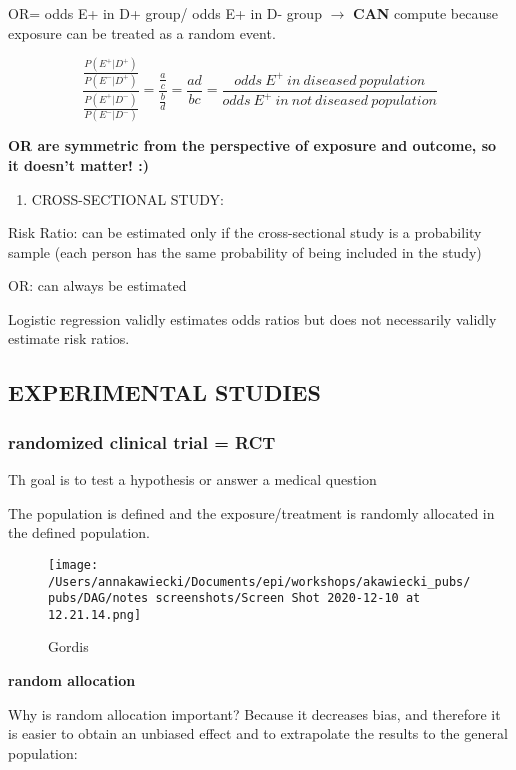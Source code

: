 \documentclass[
]{article}
\providecommand{\tightlist}{%
  \setlength{\itemsep}{0pt}\setlength{\parskip}{0pt}}
\begin{document}
OR= odds E+ in D+ group/ odds E+ in D- group \(\to\) \textbf{CAN}
compute because exposure can be treated as a random event.

\[\frac{\frac{P(E^+|D^+)}{P(E^-|D^+)}}{\frac{P(E^+|D^-)}{P(E^-|D^-)}}=\frac{\frac{a}{c}}{\frac{b}{d}}=\frac{ad}{bc}=\frac{odds\:E^+\:in\:diseased\:population}{odds\:E^+\:in\:not\:diseased\:population}\]

\textbf{OR are symmetric from the perspective of exposure and outcome,
so it doesn't matter! :) }

\begin{enumerate}
\def\labelenumi{\arabic{enumi}.}
\setcounter{enumi}{2}
\tightlist
\item
  CROSS-SECTIONAL STUDY:
\end{enumerate}

Risk Ratio: can be estimated only if the cross-sectional study is a
probability sample (each person has the same probability of being
included in the study)

OR: can always be estimated

Logistic regression validly estimates odds ratios but does not
necessarily validly estimate risk ratios.

\hypertarget{experimental-studies}{%
\subsection{EXPERIMENTAL STUDIES}\label{experimental-studies}}

\hypertarget{randomized-clinical-trial-rct}{%
\subsubsection{randomized clinical trial =
RCT}\label{randomized-clinical-trial-rct}}

Th goal is to test a hypothesis or answer a medical question

The population is defined and the exposure/treatment is randomly
allocated in the defined population.

\begin{figure}
\centering
\texttt{[image: /Users/annakawiecki/Documents/epi/workshops/akawiecki\_pubs/pubs/DAG/notes screenshots/Screen Shot 2020-12-10 at 12.21.14.png]}
\caption{Gordis}
\end{figure}

\textbf{random allocation}

Why is random allocation important? Because it decreases bias, and
therefore it is easier to obtain an unbiased effect and to extrapolate
the results to the general population:
\end{document}
